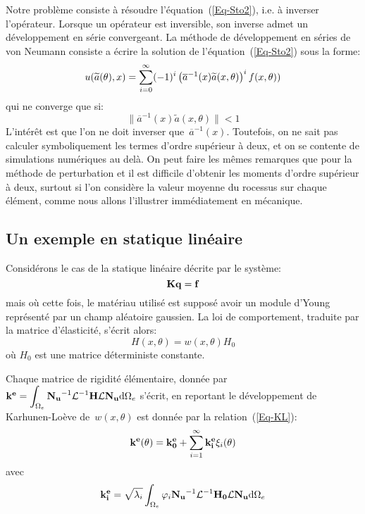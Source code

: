 Notre problème consiste à résoudre l'équation~(\ref{Eq-Sto2}), i.e. à inverser l'opérateur.
Lorsque un opérateur est inversible, son inverse admet un développement en série convergeant.
La méthode de développement en séries de von Neumann consiste a écrire la solution de l'équation~(\ref{Eq-Sto2}) sous la forme:
\begin{equation}\label{Eq-StoNeu}
u(\widetilde{a}(\theta),x)=\displaystyle\sum_{i=0}^\infty (-1)^i \begin{pmatrix}\overline{a}^{-1}(x)\widetilde{a}(x,\theta)\end{pmatrix}^i f(x,\theta))
\end{equation}
qui ne converge que si:
\begin{equation}
\|\overline{a}^{-1}(x)\widetilde{a}(x,\theta)\| <1
\end{equation}
L'intérêt est que l'on ne doit inverser que~$\overline{a}^{-1}(x)$.
Toutefois, on ne sait pas calculer symboliquement les termes d'ordre supérieur à deux, et on se contente de simulations numériques au delà.
On peut faire les mêmes remarques que pour la méthode de perturbation et il est difficile d'obtenir les moments d'ordre supérieur à deux, surtout si l'on considère la valeur moyenne du rocessus sur chaque élément, comme nous allons l'illustrer immédiatement en mécanique.

\medskip
\subsection{Un exemple en statique linéaire}

Considérons le cas de la statique linéaire décrite par le système:
$$ \MM{K}\VV{q}=\VV{f} $$
mais où cette fois, le matériau utilisé est supposé avoir un module d'Young représenté par un champ aléatoire gaussien.
La loi de comportement, traduite par la matrice d'élasticité, s'écrit alors:
\begin{equation}
H(x,\theta)=w(x,\theta)H_0
\end{equation}
où $H_0$ est une matrice déterministe constante.

Chaque matrice de rigidité élémentaire, donnée par $\MM{k^e}=\dint_{\Omega_e} \MMI{N_u}\MMI{\mathcal{L}}\MM{H}\MM{\mathcal{L}}\MM{N_u} \dd\Omega_e$ s'écrit, en reportant le développement de Karhunen-Loève de~$w(x,\theta)$ est donnée par la relation~(\ref{Eq-KL}):
\begin{equation}
\MM{k^e(\theta)}=\MM{k^e_0} +\dsum_{i=1}^\infty \MM{k_i^e}\xi_i(\theta)
\end{equation} 
avec
\begin{equation}
\MM{k_i^e}=\sqrt{\lambda_i}\dint_{\Omega_e} \varphi_i\MMI{N_u}\MMI{\mathcal{L}}\MM{H_0}\MM{\mathcal{L}}\MM{N_u} \dd\Omega_e
\end{equation}

